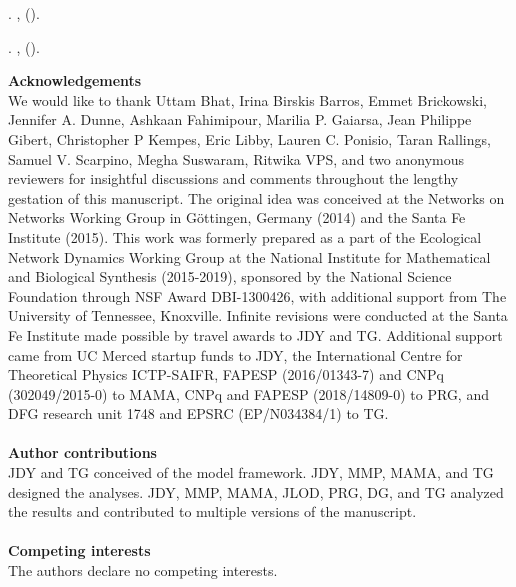 \documentclass[twocolumn,preprintnumbers,amsmath,amssymb,superscriptaddress,linenumbers]{revtex4-1}
\begin{document}
\begin{bibunit}
\begin{thebibliography}{10}
\newblock {}.
\newblock \emph{}
  \textbf{}, 
  ().

\newblock {}.
\newblock \emph{}
  \textbf{}, 
  ().

\end{thebibliography}

\end{bibunit}
% 


\vspace{2mm}
\noindent \textbf{Acknowledgements}\\
  \footnotesize{
  We would like to thank
  Uttam Bhat,
  Irina Birskis Barros,
  Emmet Brickowski,
  Jennifer A. Dunne,
  Ashkaan Fahimipour,
  Marilia P. Gaiarsa,
  Jean Philippe Gibert,
  Christopher P Kempes,
  Eric Libby,
  Lauren C. Ponisio,
  Taran Rallings,
  Samuel V. Scarpino,
  Megha Suswaram,
  Ritwika VPS,
  and two anonymous reviewers
  for insightful discussions and comments throughout the lengthy gestation of this manuscript.
  The original idea was conceived at the Networks on Networks Working Group in G\"ottingen, Germany (2014) and the Santa Fe Institute (2015).
  This work was formerly prepared as a part of the Ecological Network Dynamics Working Group at the National Institute for Mathematical and Biological Synthesis (2015-2019), sponsored by the National Science Foundation through NSF Award DBI-1300426, with additional support from The University of Tennessee, Knoxville.
  Infinite revisions were conducted at the Santa Fe Institute made possible by travel awards to JDY and TG.
  Additional support came from UC Merced startup funds to JDY, the International Centre for Theoretical Physics ICTP-SAIFR, FAPESP (2016/01343-7) and CNPq (302049/2015-0) to MAMA, CNPq and FAPESP (2018/14809-0) to PRG, and DFG research unit 1748 and EPSRC (EP/N034384/1) to TG.
  }\\ \\
  
\noindent \textbf{Author contributions}\\
  \footnotesize{
  JDY and TG conceived of the model framework. JDY, MMP, MAMA, and TG designed the analyses. JDY, MMP, MAMA, JLOD, PRG, DG, and TG analyzed the results and contributed to multiple versions of the manuscript.
  }\\ \\
\noindent \textbf{Competing interests}\\
  \footnotesize{
  The authors declare no competing interests.
  }
\clearpage
\end{document}
